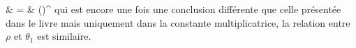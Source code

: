 	& = & \left(\right)^{}
\eea
qui est encore une fois une conclusion diff\'erente que celle pr\'esent\'ee dans le livre mais uniquement dans la constante multiplicatrice, la relation entre $\rho$ et $\theta_{1}$ est similaire.